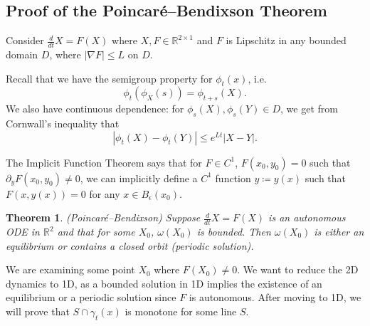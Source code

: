 \documentclass{tufte-handout}
\newcommand*\R{\mathbb{R}}
\newtheorem{thm}{Theorem}[subsection]
\theoremstyle{definition}
\begin{document}
\subsection{Proof of the Poincar\'e--Bendixson Theorem}

Consider $\frac{d}{dt}X = F(X)$ where $X,F \in \R^{2\times 1}$ and $F$ is Lipschitz in any bounded domain $D$, where $\left| \nabla F \right| \le L$ on $D$.

Recall that we have the semigroup property for $\phi_t(x)$, i.e. \[
	\phi_t(\phi_X(s)) = \phi_{t+s}(X)
.\] We also have continuous dependence: for $\phi_s(X), \phi_s(Y) \in D$, we get from Cornwall's inequality that \[
	\left| \phi_t(X) - \phi_t(Y) \right| \le e^{Lt} \left| X-Y \right|
.\] 

The Implicit Function Theorem says that for $F \in C^1$, $F(x_0, y_0) = 0$ such that $\partial_y F(x_0,y_0)\ne 0$, we can implicitly define a $C^1$ function $y \coloneqq y(x)$ such that $F(x,y(x))= 0 $ for any $x \in B_\epsilon(x_0)$. 

\begin{thm}
	(Poincar\'e--Bendixson) Suppose $\frac{d}{dt}X = F(X)$ is an autonomous ODE in $\R^2$ and that for some $X_0$, $\omega(X_0)$ is bounded. Then $\omega(X_0)$ is either an equilibrium or contains a closed orbit (periodic solution).
\end{thm}

We are examining some point $X_0$ where $F(X_0) \ne 0$. We want to reduce the 2D dynamics to 1D, as a bounded solution in 1D implies the existence of an equilibrium or a periodic solution since $F$ is autonomous. After moving to 1D, we will prove that $S \cap \gamma_t(x)$ is monotone for some line $S$.
\end{document}

